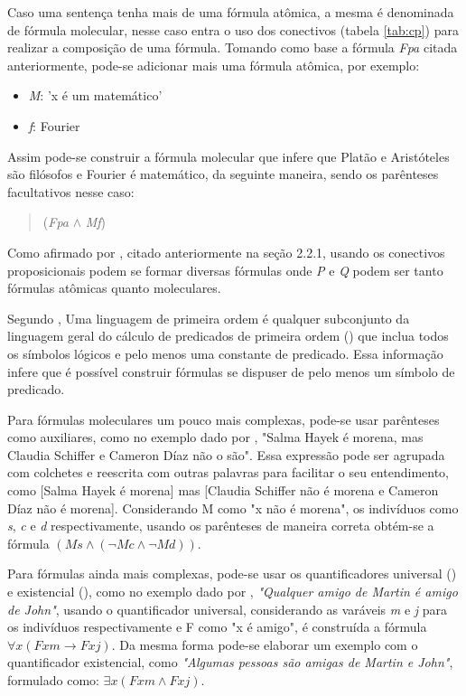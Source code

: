 Caso uma sentença tenha mais de uma fórmula atômica, a mesma é denominada de fórmula molecular, nesse caso entra o uso dos conectivos (tabela \ref{tab:cp}) para realizar a composição de uma fórmula. Tomando como base a fórmula \textit{Fpa} citada anteriormente, pode-se adicionar mais uma fórmula atômica, por exemplo:

\begin{itemize}
    \item \textit{M}: 'x é um matemático'
    \item \textit{f}: Fourier
\end{itemize}

Assim pode-se construir a fórmula molecular que infere que Platão e Aristóteles são filósofos e Fourier é matemático, da seguinte maneira, sendo os parênteses facultativos nesse caso:

\begin{quote}\centering
    (\textit{Fpa} $\land$ \textit{Mf})
\end{quote}

Como afirmado por , citado anteriormente na seção 2.2.1, usando os conectivos proposicionais podem se formar diversas fórmulas onde \textit{P} e \textit{Q} podem ser tanto fórmulas atômicas quanto moleculares.

Segundo , Uma linguagem de primeira ordem é qualquer subconjunto da linguagem geral do cálculo de predicados de primeira ordem () que inclua todos os símbolos lógicos e pelo menos uma constante de predicado. Essa informação infere que é possível construir fórmulas se dispuser de pelo menos um símbolo de predicado.

Para fórmulas moleculares um pouco mais complexas, pode-se usar parênteses como auxiliares, como no exemplo dado por , "Salma Hayek é morena, mas Claudia Schiffer e Cameron Díaz não o são". Essa expressão pode ser agrupada com colchetes e reescrita com outras palavras para facilitar o seu entendimento, como [Salma Hayek é morena] mas [Claudia Schiffer não é morena e Cameron Díaz não é morena]. Considerando M como "x não é morena", os indivíduos como \textit{s}, \textit{c} e \textit{d} respectivamente, usando os parênteses de maneira correta obtém-se a fórmula $(Ms \land (\neg Mc \land \neg Md))$.

Para fórmulas ainda mais complexas, pode-se usar os quantificadores universal () e existencial (), como no exemplo dado por , \textit{"Qualquer amigo de Martin é amigo de John"}, usando o quantificador universal, considerando as varáveis \textit{m} e \textit{j} para os indivíduos respectivamente e F como "x é amigo", é construída a fórmula $\forall x (Fxm \rightarrow Fxj)$. Da mesma forma pode-se elaborar um exemplo com o quantificador existencial, como \textit{"Algumas pessoas são amigas de Martin e John"}, formulado como: $\exists x (Fxm \land Fxj)$.

